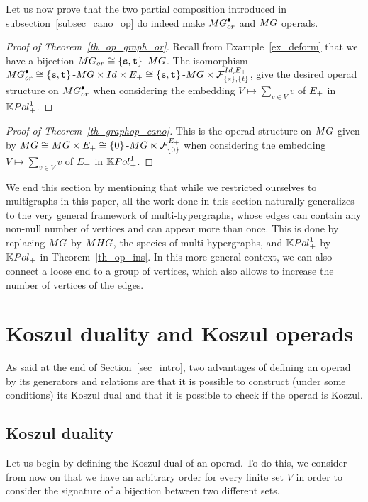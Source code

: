 \documentclass[11pt]{article}
\theoremstyle{definition}
\numberwithin{equation}{section}
\newcommand{\set}[1]{\left\{#1\right\}}
\newcommand{\spe}[1]{\normalfont{\textsc{#1}}}
\newcommand{\K}{\mathbb{K}}
\newcommand{\point}[1]{#1^{\bullet}}
\newcommand{\id}{Id}
\newcommand{\MG}{\spe{MG}}
\newcommand{\MHG}{\spe{MHG}}
\newcommand{\Poly}{\spe{Pol}_+}
\newcommand{\augm}[2]{#1\text{-}#2}
\newcommand{\func}[2]{\mathcal{F}_{#1}^{#2}}
\newcommand{\Sym}{\spe{E}}
\begin{document}
Let us now prove that the two partial composition introduced in subsection~\ref{subsec_cano_op} do indeed 
make $\point{\MG}_{or}$ and $\MG$ operads.

\begin{proof}[Proof of Theorem~\ref{th_op_graph_or}]
    Recall from Example~\ref{ex_deform} that we have a bijection 
    $\MG_{or}\cong \augm{\set{\mathtt{s,t}}}{\MG}$. The isomorphism 
    $\point{\MG_{or}}\cong \augm{\set{\mathtt{s,t}}}{\MG}\times\spe{\id}\times\Sym_+ \cong \augm{\set{\mathtt{s,t}}}{\MG}\ltimes\func{\set{s},\set{t}}{\spe{\id},\Sym_+}$, 
    give the desired operad structure on $\point{\MG_{or}}$ when considering the embedding 
    $V\mapsto \sum_{v\in V}v$ of $\Sym_+$ in $\K\Poly^1$.
\end{proof}

\begin{proof}[Proof of Theorem~\ref{th_graphop_cano}]
    This is the operad structure on $\MG$ given by 
    $\MG\cong \MG\times\Sym_+\cong \augm{\set{0}}{\MG}\ltimes\func{\set{0}}{\Sym_+}$
    when considering the embedding $V\mapsto \sum_{v\in V}v$ of $\Sym_+$ in $\K\Poly^1$.
\end{proof}

We end this section by mentioning that while we restricted ourselves to multigraphs in this paper, all the 
work done in this section naturally generalizes to the very general framework of multi-hypergraphs, whose 
edges can contain any non-null number of vertices and can appear more than once. This is done by replacing 
$\MG$ by $\MHG$, the species of multi-hypergraphs, and $\K\Poly^1$ by $\K\Poly$ in Theorem~\ref{th_op_ins}.
In this more general context, we can also connect a loose end to a group of vertices, which also allows to 
increase the number of vertices of the edges. 

\appendix


\section{Koszul duality and Koszul operads}\label{ann_koszul}
As said at the end of Section~\ref{sec_intro}, 
two advantages of defining an operad by its generators and relations are
that it is possible to construct (under some conditions) its Koszul dual and 
that it is possible to check if the operad is Koszul.


\subsection*{Koszul duality}
Let us begin by defining the Koszul dual of an operad.
To do this, we consider from now on that we have an arbitrary order for every finite set $V$ in order to consider the signature of a bijection 
between two different sets. 
\end{document}
